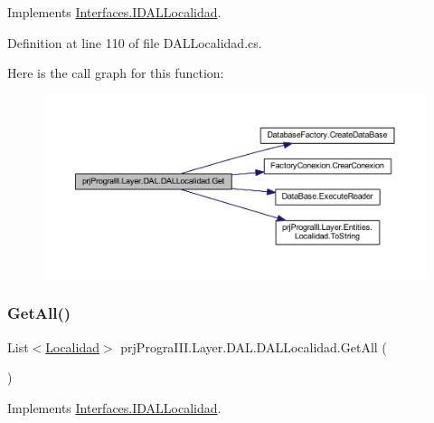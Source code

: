 Implements \hyperlink{interface_interfaces_1_1_i_d_a_l_localidad_afc7b2ff5ab6188af4b0c9c1f77961a6c}{Interfaces.\+I\+D\+A\+L\+Localidad}.



Definition at line 110 of file D\+A\+L\+Localidad.\+cs.

Here is the call graph for this function\+:
\nopagebreak
\begin{figure}[H]
\begin{center}
\leavevmode
\includegraphics[width=350pt]{classprj_progra_i_i_i_1_1_layer_1_1_d_a_l_1_1_d_a_l_localidad_a0763adaaedb581f36a311344b109ef83_cgraph}
\end{center}
\end{figure}
\hypertarget{classprj_progra_i_i_i_1_1_layer_1_1_d_a_l_1_1_d_a_l_localidad_aeac57d97dd6728e382c3b52a8ab551d3}{}\label{classprj_progra_i_i_i_1_1_layer_1_1_d_a_l_1_1_d_a_l_localidad_aeac57d97dd6728e382c3b52a8ab551d3} 
\subsubsection{\texorpdfstring{Get\+All()}{GetAll()}}
{\footnotesize\ttfamily List$<$\hyperlink{classprj_progra_i_i_i_1_1_layer_1_1_entities_1_1_localidad}{Localidad}$>$ prj\+Progra\+I\+I\+I.\+Layer.\+D\+A\+L.\+D\+A\+L\+Localidad.\+Get\+All (\begin{DoxyParamCaption}{ }\end{DoxyParamCaption})}



Implements \hyperlink{interface_interfaces_1_1_i_d_a_l_localidad_ab0985713e92391e4d781cf8bcf3eba45}{Interfaces.\+I\+D\+A\+L\+Localidad}.



